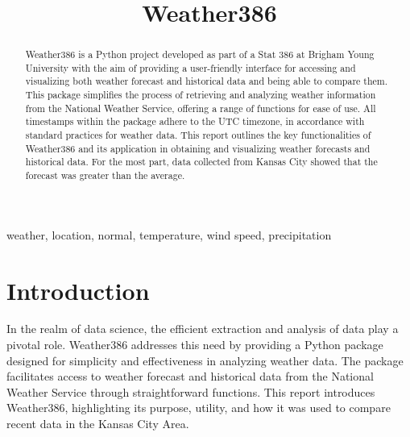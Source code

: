 \documentclass[conference]{IEEEtran}
\begin{document}
\title{Weather386}

\author{
  \and
}

\maketitle

\begin{abstract}
    Weather386 is a Python project developed as part of a Stat 386 at Brigham Young University with the aim of providing a user-friendly interface for accessing and visualizing both weather forecast and historical data and being able to compare them. This package simplifies the process of retrieving and analyzing weather information from the National Weather Service, offering a range of functions for ease of use. All timestamps within the package adhere to the UTC timezone, in accordance with standard practices for weather data. This report outlines the key functionalities of Weather386 and its application in obtaining and visualizing weather forecasts and historical data. For the most part, data collected from Kansas City showed that the forecast was greater than the average.
\end{abstract}

\begin{IEEEkeywords}
weather, location, normal, temperature, wind speed, precipitation
\end{IEEEkeywords}

\section{Introduction}
    In the realm of data science, the efficient extraction and analysis of data play a pivotal role. Weather386 addresses this need by providing a Python package designed for simplicity and effectiveness in analyzing weather data. The package facilitates access to weather forecast and historical data from the National Weather Service through straightforward functions. This report introduces Weather386, highlighting its purpose, utility, and how it was used to compare recent data in the Kansas City Area.
\end{document}
